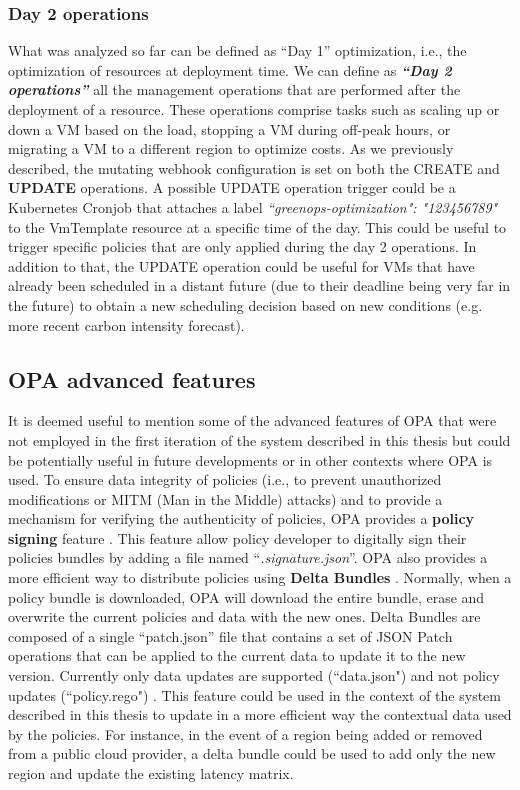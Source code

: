 \subsubsection{Day 2 operations}
\label{sec:day2_operations}

What was analyzed so far can be defined as ``Day 1'' optimization, i.e., the optimization of resources at deployment time.
We can define as \textbf{\textit{``Day 2 operations''}} all the management operations that are performed after the deployment of a resource.
These operations comprise tasks such as scaling up or down a VM based on the load, stopping a VM during off-peak hours, or migrating a VM to a different region to optimize costs.
As we previously described, the mutating webhook configuration is set on both the CREATE and \textbf{UPDATE} operations.
A possible UPDATE operation trigger could be a Kubernetes Cronjob that attaches a label \textit{``greenops-optimization": "123456789"} to the VmTemplate resource at a specific time of the day.
This could be useful to trigger specific policies that are only applied during the day 2 operations.
In addition to that, the UPDATE operation could be useful for VMs that have already been scheduled in a distant future (due to their deadline being very far in the future) to obtain a new scheduling decision based on new conditions (e.g. more recent carbon intensity forecast).

\subsection{OPA advanced features}

It is deemed useful to mention some of the advanced features of OPA that were not employed in the first iteration of the system described in this thesis but could be potentially useful in future developments or in other contexts where OPA is used.
\newline
To ensure data integrity of policies (i.e., to prevent unauthorized modifications or MITM (Man in the Middle) attacks) and to provide a mechanism for verifying the authenticity of policies, OPA provides a \textbf{policy signing} feature \cite{opa_signing}.
This feature allow policy developer to digitally sign their policies bundles by adding a file named ``\textit{.signature.json}''.
\newline
OPA also provides a more efficient way to distribute policies using \textbf{Delta Bundles} \cite{opa_delta_bundles}.
Normally, when a policy bundle is downloaded, OPA will download the entire bundle, erase and overwrite the current policies and data with the new ones.
Delta Bundles are composed of a single ``patch.json'' file that contains a set of JSON Patch operations that can be applied to the current data to update it to the new version. Currently only data updates are supported (``data.json") and not policy updates (``policy.rego") \cite{opa_delta_bundles}.
This feature could be used in the context of the system described in this thesis to update in a more efficient way the contextual data used by the policies. 
For instance, in the event of a region being added or removed from a public cloud provider, a delta bundle could be used to add only the new region and update the existing latency matrix.

